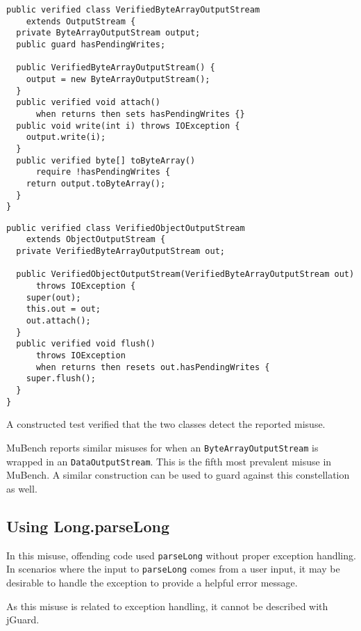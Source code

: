 \documentclass{article}
\begin{document}
\begin{minipage}[t]{0.5\textwidth}
\begin{lstlisting}[style=jGuard, basicstyle=\tiny]
public verified class VerifiedByteArrayOutputStream
    extends OutputStream {
  private ByteArrayOutputStream output;
  public guard hasPendingWrites;

  public VerifiedByteArrayOutputStream() {
    output = new ByteArrayOutputStream();
  }
  public verified void attach() 
      when returns then sets hasPendingWrites {}
  public void write(int i) throws IOException {
    output.write(i);
  }
  public verified byte[] toByteArray() 
      require !hasPendingWrites {
    return output.toByteArray();
  }
}
\end{lstlisting}
\end{minipage}
\begin{minipage}[t]{0.5\textwidth}
\begin{lstlisting}[style=jGuard, basicstyle=\tiny]
public verified class VerifiedObjectOutputStream
    extends ObjectOutputStream { 
  private VerifiedByteArrayOutputStream out; 
     
  public VerifiedObjectOutputStream(VerifiedByteArrayOutputStream out)
      throws IOException { 
    super(out); 
    this.out = out; 
    out.attach(); 
  } 
  public verified void flush()
      throws IOException
      when returns then resets out.hasPendingWrites { 
    super.flush(); 
  } 
}
\end{lstlisting}
\end{minipage}

A constructed test verified that the two classes detect the reported
misuse.

MuBench reports similar misuses for when an \texttt{ByteArrayOutputStream}
is wrapped in an \texttt{Data\-Output\-Stream}.
This is the fifth most prevalent misuse in MuBench.
A similar construction can be used to guard against this constellation as well.

\subsection{Using Long.parseLong}

In this misuse, offending code used \texttt{parseLong} without proper exception handling.
In scenarios where the input to \texttt{parseLong} comes from a user input,
it may be desirable to handle the exception to provide a helpful error message.

As this misuse is related to exception handling, it cannot be described with jGuard.
\end{document}
